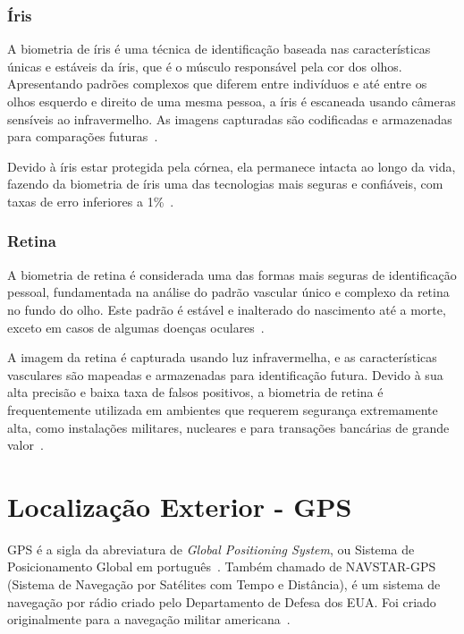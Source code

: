 \subsubsection{Íris}\label{subsubsec:iris}
A biometria de íris é uma técnica de identificação baseada nas características únicas e estáveis da íris, que é o músculo responsável pela cor dos olhos.
Apresentando padrões complexos que diferem entre indivíduos e até entre os olhos esquerdo e direito de uma mesma pessoa, a íris é escaneada usando câmeras sensíveis ao infravermelho.
As imagens capturadas são codificadas e armazenadas para comparações futuras~\cite{de2020biometria}.

Devido à íris estar protegida pela córnea, ela permanece intacta ao longo da vida, fazendo da biometria de íris uma das tecnologias mais seguras e confiáveis, com taxas de erro inferiores a 1\%~\cite{de2020biometria}.

\subsubsection{Retina}\label{subsubsec:retina}
A biometria de retina é considerada uma das formas mais seguras de identificação pessoal, fundamentada na análise do padrão vascular único e complexo da retina no fundo do olho.
Este padrão é estável e inalterado do nascimento até a morte, exceto em casos de algumas doenças oculares~\cite{de2020biometria}.

A imagem da retina é capturada usando luz infravermelha, e as características vasculares são mapeadas e armazenadas para identificação futura.
Devido à sua alta precisão e baixa taxa de falsos positivos, a biometria de retina é frequentemente utilizada em ambientes que requerem segurança extremamente alta, como instalações militares, nucleares e para transações bancárias de grande valor~\cite{de2020biometria}.


\section{Localização Exterior - GPS}\label{sec:localizacao}
GPS é a sigla da abreviatura de \textit{Global Positioning System}, ou Sistema de Posicionamento Global em português~\cite{gpsdesigning}.
Também chamado de NAVSTAR-GPS (Sistema de Navegação por Satélites com Tempo e Distância), é um sistema de navegação por rádio criado pelo Departamento de Defesa dos EUA. Foi criado originalmente para a navegação militar americana~\cite{novais2014localizaccao}.

